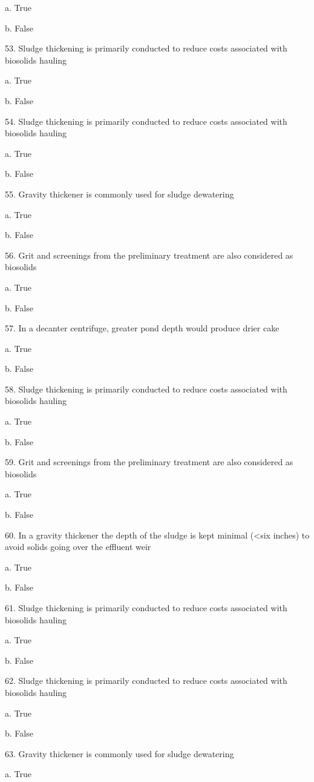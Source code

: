 \documentclass{article}
\begin{document}
a. True 

b. False 


53. Sludge thickening is primarily conducted to reduce costs associated with biosolids hauling

a. True 

b. False 


54. Sludge thickening is primarily conducted to reduce costs associated with biosolids hauling 

a. True 

b. False 


55. Gravity thickener is commonly used for sludge dewatering 

a. True 

b. False 


56. Grit and screenings from the preliminary treatment are also considered as biosolids 

a. True 

b. False 


57. In a decanter centrifuge, greater pond depth would produce drier cake 

a. True 

b. False 


58. Sludge thickening is primarily conducted to reduce costs associated with biosolids hauling 

a. True 

b. False 


59. Grit and screenings from the preliminary treatment are also considered as biosolids 

a. True 

b. False 


60. In a gravity thickener the depth of the sludge is kept minimal (<six inches) to avoid solids going over the effluent weir 

a. True 

b. False 


61. Sludge thickening is primarily conducted to reduce costs associated with biosolids hauling

a. True 

b. False 


62. Sludge thickening is primarily conducted to reduce costs associated with biosolids hauling 

a. True 

b. False 


63. Gravity thickener is commonly used for sludge dewatering 

a. True 
\end{document}

